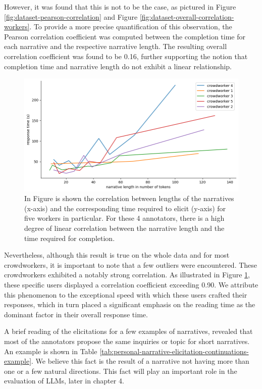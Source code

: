 However, it was found that this is not to be the case, as pictured in Figure \ref{fig:dataset-pearson-correlation} and Figure \ref{fig:dataset-overall-correlation-workers}. To provide a more precise quantification of this observation, the Pearson correlation coefficient \cite{pearson} was computed between the completion time for each narrative and the respective narrative length. The resulting overall correlation coefficient was found to be 0.16, further supporting the notion that completion time and narrative length do not exhibit a linear relationship.

\begin{figure}[!htbp]
        \includegraphics[width=1\linewidth]{assets//imgs/dataset-high-correlation-workers.png}
        \caption{In Figure is shown the correlation between lengths of the narratives (x-axis) and the corresponding time required to elicit (y-axis) for five workers in particular. For these 4 annotators, there is a high degree of linear correlation between the narrative length and the time required for completion.}
        \label{fig:dataset-high-correlation-workers}
\end{figure}
Nevertheless, although this result is true on the whole data and for most crowdworkers, it is important to note that a few outliers were encountered. These crowdworkers exhibited a notably strong correlation. As illustrated in Figure \ref{fig:dataset-high-correlation-workers}, these specific users displayed a correlation coefficient exceeding 0.90. We attribute this phenomenon to the exceptional speed with which these users crafted their responses, which in turn placed a significant emphasis on the reading time as the dominant factor in their overall response time.


A brief reading of the elicitations for a few examples of narratives, revealed that most of the annotators propose the same inquiries or topic for short narratives. An example is shown in Table \ref{tab:personal-narrative-elicitation-continuations-example}. We believe this fact is the result of a narrative not having more than one or a few natural directions. This fact will play an important role in the evaluation of LLMs, later in chapter 4.
